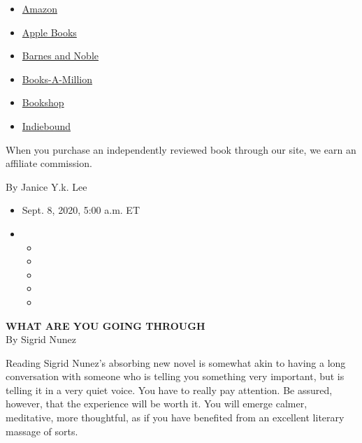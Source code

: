 \begin{itemize}
\tightlist
\item
  \href{https://www.amazon.com/gp/search?index=books\&tag=NYTBSREV-20\&field-keywords=What+Are+You+Going+Through+Sigrid+Nunez}{Amazon}
\item
  \href{https://du-gae-books-dot-nyt-du-prd.appspot.com/buy?title=What+Are+You+Going+Through\&author=Sigrid+Nunez}{Apple
  Books}
\item
  \href{https://www.anrdoezrs.net/click-7990613-11819508?url=https\%3A\%2F\%2Fwww.barnesandnoble.com\%2Fw\%2F\%3Fean\%3D9780593191415}{Barnes
  and Noble}
\item
  \href{https://www.anrdoezrs.net/click-7990613-35140?url=https\%3A\%2F\%2Fwww.booksamillion.com\%2Fp\%2FWhat\%2BAre\%2BYou\%2BGoing\%2BThrough\%2FSigrid\%2BNunez\%2F9780593191415}{Books-A-Million}
\item
  \href{https://bookshop.org/a/3546/9780593191415}{Bookshop}
\item
  \href{https://www.indiebound.org/book/9780593191415?aff=NYT}{Indiebound}
\end{itemize}

When you purchase an independently reviewed book through our site, we
earn an affiliate commission.

By Janice Y.k. Lee

\begin{itemize}
\item
  Sept. 8, 2020, 5:00 a.m. ET
\item
  \begin{itemize}
  \item
  \item
  \item
  \item
  \item
  \end{itemize}
\end{itemize}

\textbf{WHAT ARE YOU GOING THROUGH}\\
By Sigrid Nunez

Reading Sigrid Nunez's absorbing new novel is somewhat akin to having a
long conversation with someone who is telling you something very
important, but is telling it in a very quiet voice. You have to really
pay attention. Be assured, however, that the experience will be worth
it. You will emerge calmer, meditative, more thoughtful, as if you have
benefited from an excellent literary massage of sorts.

